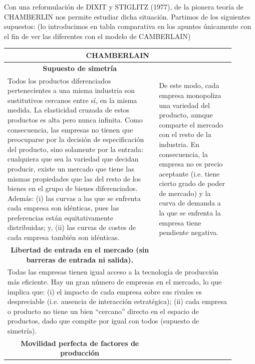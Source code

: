 \documentclass[10pt,a4paper]{article}
\begin{document}
Con una reformulación de DIXIT y STIGLITZ (1977), de la pionera teoría de CHAMBERLIN nos permite estudiar dicha situación. Partimos de los siguientes supuestos: (lo introducimos en tabla comparativa en los apuntes únicamente con el fin de ver las diferentes con el modelo de CAMBERLAIN)

\begin{center}
\setlength{\tabcolsep}{6pt}
\renewcommand{\arraystretch}{1.2}
\begin{tabular}{|p{0.30\linewidth}|p{0.30\linewidth}|p{0.30\linewidth}|}
\hline
\multicolumn{3}{|c|}{\textbf{CHAMBERLAIN}}\\
\hline
\multicolumn{2}{|c|}{\textbf{Supuesto de simetría}} & \\ 
\hline
\multicolumn{2}{|p{0.60\linewidth}|}{%
Todos los productos diferenciados pertenecientes a una misma industria son sustitutivos cercanos entre sí, en la misma medida. La elasticidad cruzada de estos productos es alta pero nunca infinita. Como consecuencia, las empresas no tienen que preocuparse por la decisión de especificación del producto, sino solamente por la entrada: cualquiera que sea la variedad que decidan producir, existe un mercado que tiene las mismas propiedades que las del resto de los bienes en el grupo de bienes diferenciados. Además: (i) las curvas a las que se enfrenta cada empresa son idénticas, pues las preferencias están equitativamente distribuidas; y, (ii) las curvas de costes de cada empresa también son idénticas.%
} &
De este modo, cada empresa monopoliza una variedad del producto, aunque comparte el mercado con el resto de la industria. En consecuencia, la empresa no es precio aceptante (i.e. tiene cierto grado de poder de mercado) y la curva de demanda a la que se enfrenta la empresa tiene pendiente negativa.\\
\hline
\multicolumn{2}{|c|}{\textbf{Libertad de entrada en el mercado (sin barreras de entrada ni salida).}} & \\
\hline
\multicolumn{3}{|p{0.90\linewidth}|}{%
Todas las empresas tienen igual acceso a la tecnología de producción más eficiente. Hay un gran número de empresas en el mercado, lo que implica que: (i) el impacto de cada empresa sobre sus rivales es despreciable (i.e. ausencia de interacción estratégica); (ii) cada empresa o producto no tiene un bien ``cercano'' directo en el espacio de productos, dado que compite por igual con todos (supuesto de simetría).%
}\\
\hline
\multicolumn{2}{|c|}{\textbf{Movilidad perfecta de factores de producción}} & \\

\end{tabular}
\end{center}
\end{document}
